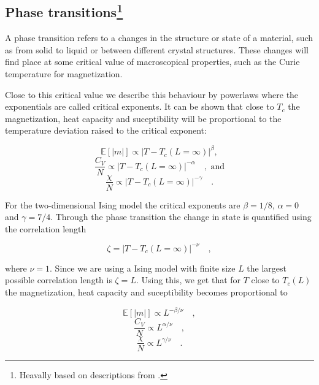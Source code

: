 \documentclass[../main_proj4_correct_template.tex]{subfiles}
\begin{document}
\subsection{Phase transitions\footnote{Heavally based on descriptions from \cite{prosjekttbeskrivelse4}.}}

A phase transition refers to a changes in the structure or state of a material, such as from solid to liquid or between different crystal structures. These changes will find place at some critical value of macroscopical properties, such as the Curie temperature for magnetization. 

Close to this critical value we describe this behaviour by powerlaws where the exponentials are called critical exponents. It can be shown that close to $T_c$ the magnetization, heat capacity and suceptibility will be proportional to the temperature deviation raised to the critical exponent:

\begin{equation}
    \mathbb{E}[|m|] \propto | T-T_c(L=\infty)|^{\beta}, 
\end{equation}
\begin{equation}
\label{eq:p4cv1}
    \frac{C_V}{N}\propto | T-T_c(L=\infty)|^{-\alpha} \quad , \text{ and}
\end{equation}
\begin{equation}
\label{eq:p4chi1}
    \frac{\chi}{N}\propto | T-T_c(L=\infty)|^{-\gamma} \quad.
\end{equation}

For the two-dimensional Ising model the critical exponents are $\beta=1/8$, $\alpha=0$ and $\gamma = 7/4$. Through the phase transition the change in state is quantified using the correlation length

\begin{equation}
    \label{eq:p4_correlation_len}
    \zeta = |T - T_c(L=\infty)|^{-\nu} \quad, 
\end{equation}

where $\nu=1$. Since we are using a Ising model with finite size $L$ the largest possible correlation length is $\zeta=L$. Using this, we get that for $T$ close to $T_c(L)$ the magnetization, heat capacity and suceptibility becomes proportional to 

\begin{equation}
    \mathbb{E}[|m|] \propto L^{-\beta/\nu}\quad , 
\end{equation}
\begin{equation}
\label{eq:p4cv2}
    \frac{C_V}{N}\propto L^{\alpha/\nu} \quad, 
\end{equation}
\begin{equation}
\label{eq:p4chi2}
    \frac{\chi}{N}\propto L^{\gamma/\nu} \quad.
\end{equation}
\end{document}
